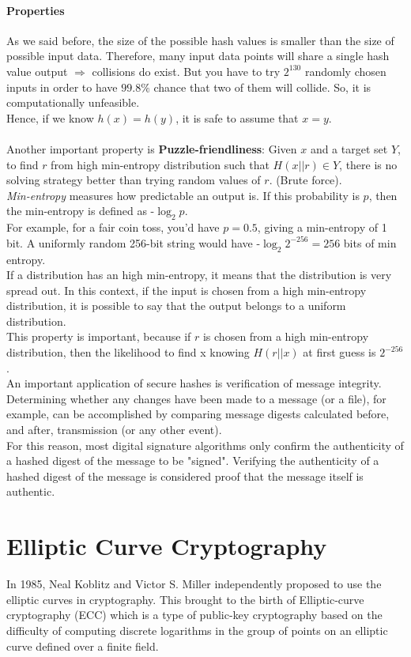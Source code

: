 \paragraph{Properties} 
As we said before, the size of the possible hash values is smaller than the size of possible input data. Therefore, many input data points will share a single hash value output $\Rightarrow$ collisions do exist. But you have to try $2^{130}$ randomly chosen inputs in order to have $99.8 \% $ chance that two of them will collide. So, it is computationally unfeasible.\\
Hence, if we know $h(x) = h(y)$, it is safe to assume that $x= y$.\\ 
\\
Another important property is \textbf{Puzzle-friendliness}:
Given $x$ and a target set $Y$, to find $r$ from high min-entropy distribution such that $H(x||r)\in Y$, there is no solving strategy better than trying random values of $r$. (Brute force).\\
\textit{Min-entropy} measures how predictable an output is. If this probability is $p$, then the min-entropy is defined as -$\log_{2} p$.\\
For example, for a fair coin toss, you'd have $p = 0.5$, giving a min-entropy of 1 bit. A uniformly random 256-bit string would have -$\log_{2} 2^{-256} = 256$ bits of min entropy.\\
If a distribution has an high min-entropy, it means that the distribution is very spread out. In this context, if the input is chosen from a high min-entropy distribution, it is possible to say that the output belongs to a uniform distribution.\\
This property is important, because if $r$ is chosen from a high min-entropy distribution, then the likelihood to find x knowing $H(r||x)$ at first guess is $2^{-256}$.
\\
An important application of secure hashes is verification of message integrity. Determining whether any changes have been made to a message (or a file), for example, can be accomplished by comparing message digests calculated before, and after, transmission (or any other event).\\
For this reason, most digital signature algorithms only confirm the authenticity of a hashed digest of the message to be "signed". Verifying the authenticity of a hashed digest of the message is considered proof that the message itself is authentic.


\section{Elliptic Curve Cryptography}
In 1985, Neal Koblitz \cite{Koblitz} and Victor S. Miller \cite{Miller} independently proposed to use the elliptic curves in cryptography. This brought to the birth of Elliptic-curve cryptography (ECC) which is a type of public-key cryptography based on the difficulty of computing discrete logarithms in the group of points on an elliptic curve defined over a finite field. 

